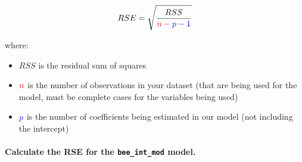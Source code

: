 \documentclass[
  openany]{book}
\newenvironment{Shaded}{\begin{snugshade}}{\end{snugshade}}
\newcommand{\DecValTok}[1]{\textcolor[rgb]{0.00,0.00,0.81}{#1}}
\newcommand{\FunctionTok}[1]{\textcolor[rgb]{0.00,0.00,0.00}{#1}}
\newcommand{\NormalTok}[1]{#1}
\newcommand{\OtherTok}[1]{\textcolor[rgb]{0.56,0.35,0.01}{#1}}
\newcommand{\SpecialCharTok}[1]{\textcolor[rgb]{0.00,0.00,0.00}{#1}}
\providecommand{\tightlist}{%
  \setlength{\itemsep}{0pt}\setlength{\parskip}{0pt}}
\begin{document}
\begin{Shaded}
\end{Shaded}

\[RSE = \sqrt{\frac{RSS}{\color{red}n-\color{blue}p-1}}\]

where:

\begin{itemize}
\tightlist
\item
  \(RSS\) is the residual sum of squares
\item
  \(\color{red}n\) is the number of observations in your dataset (that are being used for the model, must be complete cases for the variables being used)
\item
  \(\color{blue}p\) is the number of coefficients being estimated in our model (not including the intercept)
\end{itemize}

\hypertarget{calculate-the-rse-for-the-bee_int_mod-model.}{%
\paragraph{\texorpdfstring{Calculate the RSE for the \texttt{bee\_int\_mod} model.}{Calculate the RSE for the bee\_int\_mod model.}}\label{calculate-the-rse-for-the-bee_int_mod-model.}}
\end{document}
